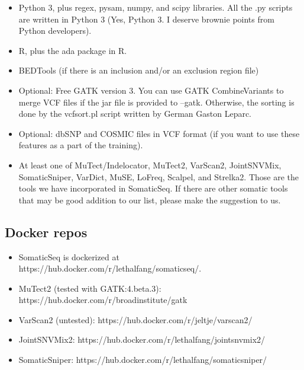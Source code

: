 \documentclass[10pt,letterpaper]{article}
\begin{document}
\begin{sloppypar}
\begin{itemize}
\item
Python 3, plus regex, pysam, numpy, and scipy libraries. All the .py scripts are written in Python 3 (Yes, Python 3. I deserve brownie points from Python developers).

\item
R, plus the ada package in R.

\item
BEDTools (if there is an inclusion and/or an exclusion region file)

\item
Optional: Free GATK version 3. You can use GATK CombineVariants to merge VCF files if the jar file is provided to --gatk. Otherwise, the sorting is done by the vcfsort.pl script written by German Gaston Leparc. 

\item
Optional: dbSNP and COSMIC files in VCF format (if you want to use these features as a part of the training).

\item
At least one of MuTect/Indelocator, MuTect2, VarScan2, JointSNVMix, SomaticSniper, VarDict, MuSE, LoFreq, Scalpel, and Strelka2. Those are the tools we have incorporated in SomaticSeq. If there are other somatic tools that may be good addition to our list, please make the suggestion to us. 

\end{itemize}


\subsection{Docker repos}

\begin{itemize}

  \item SomaticSeq is dockerized at https://hub.docker.com/r/lethalfang/somaticseq/.
  
  \item MuTect2 (tested with GATK:4.beta.3): https://hub.docker.com/r/broadinstitute/gatk

  \item VarScan2 (untested): https://hub.docker.com/r/jeltje/varscan2/

  \item JointSNVMix2: https://hub.docker.com/r/lethalfang/jointsnvmix2/

  \item SomaticSniper: https://hub.docker.com/r/lethalfang/somaticsniper/


\end{itemize}
\end{sloppypar}
\end{document}
